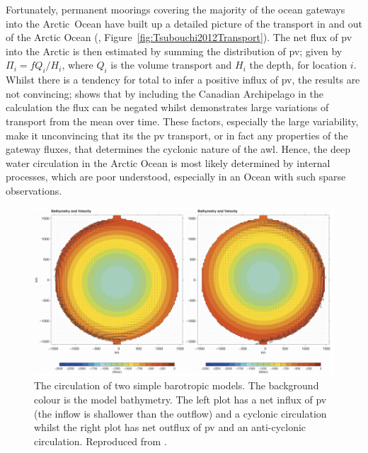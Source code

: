 \documentclass[12pt,a4paper]{report}
\newcommand*\figref[1]{Figure~\ref{#1}}
\begin{document}
Fortunately, permanent moorings 
covering the majority of the ocean gateways into the Arctic~Ocean have built
up a detailed picture of the transport in and out of the Arctic Ocean 
(\cite{tsubouchi2012arctic}, \figref{fig:Tsubouchi2012Transport}). The net flux of \gls{pv} into the Arctic is then estimated by summing the distribution of \gls{pv}; given by $ \Pi_{i} = fQ_{i}/H_{i}$,
where $Q_{i}$ is the volume transport and $H_i$ the depth, for location $i$. 
Whilst there is a tendency for total to infer a positive influx of \gls{pv}, the
results are not convincing; \cite{munchow2006observational} shows that by including the
Canadian Archipelago in the \cite{yang2005arctic} calculation the flux can be negated whilst
\cite{tsubouchi2012arctic} demonstrates large variations of transport from the mean over time.
These factors, especially the large variability, make it unconvincing that its the \gls{pv}
 transport, or in fact any properties of the gateway fluxes, that determines the 
cyclonic nature of the \gls{awl}.
Hence, the deep water circulation in the Arctic Ocean is most likely determined by 
internal processes, which are poor understood, especially in an Ocean with such sparse observations.

\begin{figure}
	\centering
	\includegraphics[width=\linewidth]{Yang2005}
	\caption[\cite{yang2005arctic}]{ The circulation of two simple barotropic
		models. The background colour is the model bathymetry. The left plot has
		a net influx of \gls{pv} (the inflow is shallower than the outflow) 
		and a cyclonic circulation whilst the right plot has net outflux of  \gls{pv} 
		and an anti-cyclonic circulation. Reproduced from \cite{yang2005arctic}.}
	\label{fig:Yang2005}
\end{figure}
\end{document}
